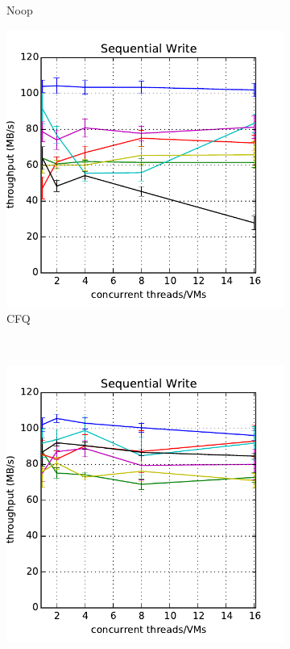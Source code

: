 \documentclass{acmsig}
\begin{document}
\begin{figure}[t]
\begin{subfigure}[b]{0.3\textwidth}
     \caption{Noop}
     \label{fig:aggthroughput_noop_read}
   \end{subfigure}
   \hfill
   \begin{subfigure}[b]{0.3\textwidth}
     \includegraphics[width=\textwidth]{figures/throughput_cfq_write.pdf}
     \caption{CFQ}
     \label{fig:aggthroughput_cfq_write}
   \end{subfigure}%
   ~ %
   \begin{subfigure}[b]{0.3\textwidth}
     \includegraphics[width=\textwidth]{figures/throughput_deadline_write.pdf}

\end{subfigure}
\end{figure}
\end{document}
